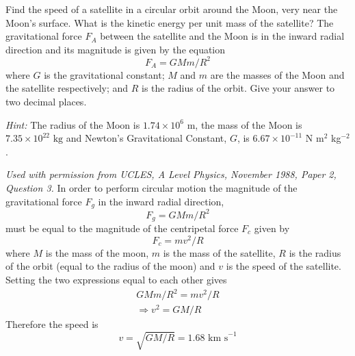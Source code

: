 \begin{problem}
{Find the speed of a satellite in a circular orbit around the Moon, very near the Moon's surface. What is the kinetic energy per unit mass of the satellite?
The gravitational force $F_A$ between the satellite and the Moon is in the inward radial direction and its magnitude is given by the equation 
\begin{equation*}
F_A=GMm/R^2
\end{equation*}
where $G$ is the gravitational constant; $M$ and $m$ are the masses of the Moon and the satellite respectively; and $R$ is the radius of the orbit. Give your answer to two decimal places.

\emph{Hint:} The radius of the Moon is $1.74\times 10^6\textrm{ m}$, the mass of the Moon is $7.35\times 10^{22}\textrm{ kg}$ and Newton's Gravitational Constant, $G$, is $6.67 \times 10^{-11}$ N m$^{2}$ kg$^{-2}$.} 
{\textit{Used with permission from UCLES, A Level Physics, November 1988, Paper 2, Question 3.}}
{In order to perform circular motion the magnitude of the gravitational force $F_g$ in the inward radial direction, 
\begin{equation*} F_g=GMm/R^2 \end{equation*}
must be equal to the magnitude of the centripetal force $F_c$ given by 
\begin{equation*} F_c=mv^2/R \end{equation*}
where $M$ is the mass of the moon, $m$ is the mass of the satellite, $R$ is the radius of the orbit (equal to the radius of the moon) and $v$ is the speed of the satellite. Setting the two expressions equal to each other gives
\begin{align*} GMm/R^2=mv^2/R \\ \Rightarrow v^2=GM/R \end{align*}
Therefore the speed is 
\begin{equation*} v=\sqrt{GM/R}=1.68\textrm{ km s}^{-1} \end{equation*} 
}
\end{problem}